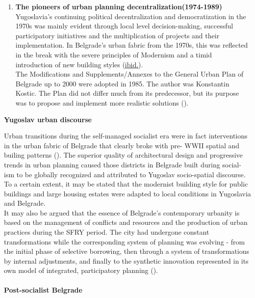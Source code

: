 \documentclass[11pt]{report}
\begin{document}
{{{{\begin{enumerate}
\item \textbf{The pioneers of urban planning decentralization(1974-1989)}
\\
Yugoslavia’s continuing political decentralization and democratization in the 1970s was mainly evident through local level decision-making, successful participatory initiatives and the multiplication of projects and their implementation. In Belgrade’s urban fabric from the 1970s, this was reflected in the break with the severe principles of Modernism and a timid introduction of new building styles (\href{ref}{ibid.}).
\\
The Modifications  and  Supplements/Annexes  to  the  General  Urban  Plan  of  Belgrade  up  to 2000 were adopted in 1985. The author was Konstantin Kostic.
The Plan did not differ much from its predecessor, but its purpose was to propose and implement more realistic solutions (\href{Grozdanic}{\citealt{grozdanic_belgrade_2008}}).
\end{enumerate}
 
\textbf{Yugoslav urban discourse}

Urban transitions during the self-managed socialist era were in fact interventions in the urban fabric of Belgrade that clearly broke with pre- WWII spatial and builing patterns (\href{Hirt}{\citealt{hirt_belgrade_2009}}). The superior quality of architectural design and progressive trends in urban planning caused those districts in Belgrade built during social- ism to be globally recognized and attributed to Yugoslav socio-spatial discourse. To a certain extent, it may be stated that the modernist building style for public buildings and large housing estates were adapted to local conditions in Yugoslavia and Belgrade.
\\

It may also be argued that the essence of Belgrade’s contemporary urbanity is based on the management of conflicts and resources and the production of urban practices during the SFRY period. The city had undergone constant transformations while the corresponding system of planning was evolving - from the initial phase of selective borrowing, then through a system of transformations by internal adjustments, and finally to the synthetic innovation represented in its own model of integrated, participatory planning (\href{Nedovic}{\citealt{nedovicbudic_waves_2006}}).

\paragraph{Post-socialist Belgrade}

}}}}
\end{document}
